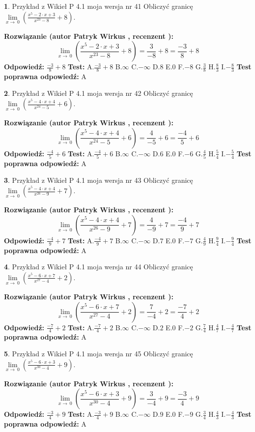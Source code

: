\documentclass[12pt, a4paper]{article}
\theoremstyle{definition} %
\newtheorem{zad}{}
\newcommand{\zadStart}[1]{\begin{zad}#1\newline}
\newcommand{\zadStop}{\end{zad}}
\newcommand{\rozwStart}[2]{\noindent \textbf{Rozwiązanie (autor #1 , recenzent #2): }\newline}
\newcommand{\rozwStop}{\newline}
\newcommand{\odpStart}{\noindent \textbf{Odpowiedź:}\newline}
\newcommand{\odpStop}{\newline}
\newcommand{\testStart}{\noindent \textbf{Test:}\newline}
\newcommand{\testStop}{\newline}
\newcommand{\kluczStart}{\noindent \textbf{Test poprawna odpowiedź:}\newline}
\newcommand{\kluczStop}{\newline}
\begin{document}
\zadStart{Przykład z Wikieł P 4.1 moja wersja nr 41}
Obliczyć granicę $\lim\limits_{x\to\ 0}(\frac{x^{5}-2 \cdot x +3}{x^{23}-8}+8)$.
\zadStop
\rozwStart{Patryk Wirkus}{}
$$\lim\limits_{x\to\ 0}(\frac{x^{5}-2 \cdot x +3}{x^{23}-8}+8)=\frac{3}{-8}+8=\frac{-3}{8}+8$$
\rozwStop
\odpStart
$\frac{-3}{8}+8$
\odpStop
\testStart
A.$\frac{-3}{8}+8$
B.$\infty$
C.$-\infty$
D.$8$
E.$0$
F.$-8$
G.$\frac{3}{8}$
H.$\frac{8}{3}$
I.$-\frac{8}{3}$
\testStop
\kluczStart
A
\kluczStop



\zadStart{Przykład z Wikieł P 4.1 moja wersja nr 42}
Obliczyć granicę $\lim\limits_{x\to\ 0}(\frac{x^{5}-4 \cdot x +4}{x^{24}-5}+6)$.
\zadStop
\rozwStart{Patryk Wirkus}{}
$$\lim\limits_{x\to\ 0}(\frac{x^{5}-4 \cdot x +4}{x^{24}-5}+6)=\frac{4}{-5}+6=\frac{-4}{5}+6$$
\rozwStop
\odpStart
$\frac{-4}{5}+6$
\odpStop
\testStart
A.$\frac{-4}{5}+6$
B.$\infty$
C.$-\infty$
D.$6$
E.$0$
F.$-6$
G.$\frac{4}{5}$
H.$\frac{5}{4}$
I.$-\frac{5}{4}$
\testStop
\kluczStart
A
\kluczStop



\zadStart{Przykład z Wikieł P 4.1 moja wersja nr 43}
Obliczyć granicę $\lim\limits_{x\to\ 0}(\frac{x^{5}-4 \cdot x +4}{x^{26}-9}+7)$.
\zadStop
\rozwStart{Patryk Wirkus}{}
$$\lim\limits_{x\to\ 0}(\frac{x^{5}-4 \cdot x +4}{x^{26}-9}+7)=\frac{4}{-9}+7=\frac{-4}{9}+7$$
\rozwStop
\odpStart
$\frac{-4}{9}+7$
\odpStop
\testStart
A.$\frac{-4}{9}+7$
B.$\infty$
C.$-\infty$
D.$7$
E.$0$
F.$-7$
G.$\frac{4}{9}$
H.$\frac{9}{4}$
I.$-\frac{9}{4}$
\testStop
\kluczStart
A
\kluczStop



\zadStart{Przykład z Wikieł P 4.1 moja wersja nr 44}
Obliczyć granicę $\lim\limits_{x\to\ 0}(\frac{x^{5}-6 \cdot x +7}{x^{27}-4}+2)$.
\zadStop
\rozwStart{Patryk Wirkus}{}
$$\lim\limits_{x\to\ 0}(\frac{x^{5}-6 \cdot x +7}{x^{27}-4}+2)=\frac{7}{-4}+2=\frac{-7}{4}+2$$
\rozwStop
\odpStart
$\frac{-7}{4}+2$
\odpStop
\testStart
A.$\frac{-7}{4}+2$
B.$\infty$
C.$-\infty$
D.$2$
E.$0$
F.$-2$
G.$\frac{7}{4}$
H.$\frac{4}{7}$
I.$-\frac{4}{7}$
\testStop
\kluczStart
A
\kluczStop



\zadStart{Przykład z Wikieł P 4.1 moja wersja nr 45}
Obliczyć granicę $\lim\limits_{x\to\ 0}(\frac{x^{5}-6 \cdot x +3}{x^{30}-4}+9)$.
\zadStop
\rozwStart{Patryk Wirkus}{}
$$\lim\limits_{x\to\ 0}(\frac{x^{5}-6 \cdot x +3}{x^{30}-4}+9)=\frac{3}{-4}+9=\frac{-3}{4}+9$$
\rozwStop
\odpStart
$\frac{-3}{4}+9$
\odpStop
\testStart
A.$\frac{-3}{4}+9$
B.$\infty$
C.$-\infty$
D.$9$
E.$0$
F.$-9$
G.$\frac{3}{4}$
H.$\frac{4}{3}$
I.$-\frac{4}{3}$
\testStop
\kluczStart
A
\kluczStop
\end{document}
